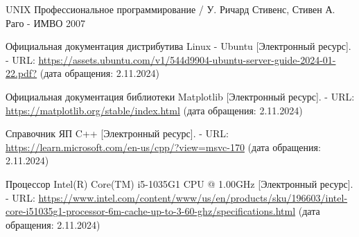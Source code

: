 
\renewcommand\bibname{Список использованной литературы}
\begin{thebibliography}{}
	
	 UNIX Профессиональное программирование / У. Ричард Стивенс, Стивен А. Раго - ИМВО 2007
	
	 Официальная документация дистрибутива Linux - Ubuntu [Электронный ресурс]. - URL: \url{https://assets.ubuntu.com/v1/544d9904-ubuntu-server-guide-2024-01-22.pdf?} (дата обращения: 2.11.2024)
	
	 Официальная документация библиотеки Matplotlib [Электронный ресурс]. - URL: \url{https://matplotlib.org/stable/index.html} (дата обращения: 2.11.2024)
	
	 Справочник ЯП C++ [Электронный ресурс]. - URL: \url{https://learn.microsoft.com/en-us/cpp/?view=msvc-170} (дата обращения: 2.11.2024)
	
	 Процессор Intel(R) Core(TM) i5-1035G1 CPU @ 1.00GHz [Электронный ресурс]. - URL: \url{https://www.intel.com/content/www/us/en/products/sku/196603/intel-core-i51035g1-processor-6m-cache-up-to-3-60-ghz/specifications.html} (дата обращения: 2.11.2024)
	
\end{thebibliography}